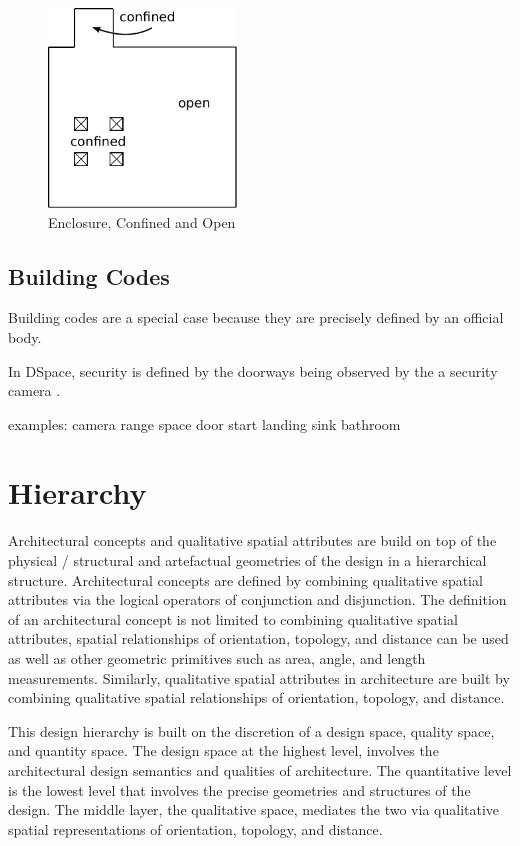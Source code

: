 \documentclass[12pt]{ucthesis}
\begin{document}
\begin{figure}[H]
\centering
\includegraphics[width=50mm]{spacious-confined}
\caption{Enclosure, Confined and Open}
\label{enclosure}
\end{figure}


\subsection{Building Codes}
Building codes are a special case because they are precisely defined by an official body. 
 
In DSpace, security is defined by the doorways being observed by the a security camera \cite{Bhatt}. 

examples: camera range space door
          start landing
          sink bathroom
          


\section{Hierarchy}
Architectural concepts and qualitative spatial attributes are build on top of the physical / structural and artefactual geometries of the design in a hierarchical structure. Architectural concepts are defined by combining qualitative spatial attributes via the logical operators of conjunction and disjunction. The definition of an architectural concept is not limited to combining qualitative spatial attributes, spatial relationships of orientation, topology, and distance can be used as well as other geometric primitives such as area, angle, and length measurements. Similarly, qualitative spatial attributes in architecture are built by combining qualitative spatial relationships of orientation, topology, and distance. 

This design hierarchy is built on the discretion of a design space, quality space, and quantity space. The design space at the highest level, involves the architectural design semantics and qualities of architecture. The quantitative level is the lowest level that involves the precise geometries and structures of the design. The middle layer, the qualitative space, mediates the two via qualitative spatial representations of orientation, topology, and distance.
\end{document}
